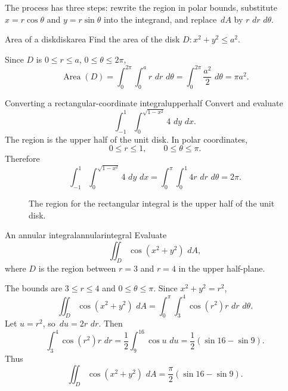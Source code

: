 \documentclass[11pt]{article}
\newcommand{\dd}{\,d}
\newcommand{\Area}{\operatorname{Area}}
\begin{document}
The process has three steps: rewrite the region in polar bounds, substitute $x=r\cos\theta$ and $y=r\sin\theta$ into the integrand, and replace $\dd A$ by $r\,\dd r\,\dd\theta$.

\begin{workedexample}{Area of a disk}{diskarea}
Find the area of the disk $D:x^2+y^2\le a^2$.

Since $D$ is $0\le r\le a$, $0\le\theta\le2\pi$,
\[
\Area(D)=\int_0^{2\pi}\int_0^a r\,\dd r\,\dd\theta
=\int_0^{2\pi}\frac{a^2}{2}\,\dd\theta=\pi a^2.
\]
\end{workedexample}

\begin{workedexample}{Converting a rectangular-coordinate integral}{upperhalf}
Convert and evaluate
\[
\int_{-1}^{1}\int_0^{\sqrt{1-x^2}}4\,\dd y\,\dd x.
\]
The region is the upper half of the unit disk. In polar coordinates,
\[
0\le r\le1,\qquad 0\le\theta\le\pi.
\]
Therefore
\[
\int_{-1}^{1}\int_0^{\sqrt{1-x^2}}4\,\dd y\,\dd x
=\int_0^\pi\int_0^1 4r\,\dd r\,\dd\theta=2\pi.
\]
\end{workedexample}

\begin{figure}[H]
\centering
{}
\caption{The region for the rectangular integral is the upper half of the unit disk.}
\end{figure}

\begin{workedexample}{An annular integral}{annularintegral}
Evaluate
\[
\iint_D \cos(x^2+y^2)\,\dd A,
\]
where $D$ is the region between $r=3$ and $r=4$ in the upper half-plane.

The bounds are $3\le r\le4$ and $0\le\theta\le\pi$. Since $x^2+y^2=r^2$,
\[
\iint_D \cos(x^2+y^2)\,\dd A
=\int_0^\pi\int_3^4 \cos(r^2)r\,\dd r\,\dd\theta.
\]
Let $u=r^2$, so $\dd u=2r\,\dd r$. Then
\[
\int_3^4 \cos(r^2)r\,\dd r=\frac12\int_9^{16}\cos u\,\dd u=\frac12(\sin16-\sin9).
\]
Thus
\[
\iint_D \cos(x^2+y^2)\,\dd A=\frac{\pi}{2}(\sin16-\sin9).
\]
\end{workedexample}
\end{document}

